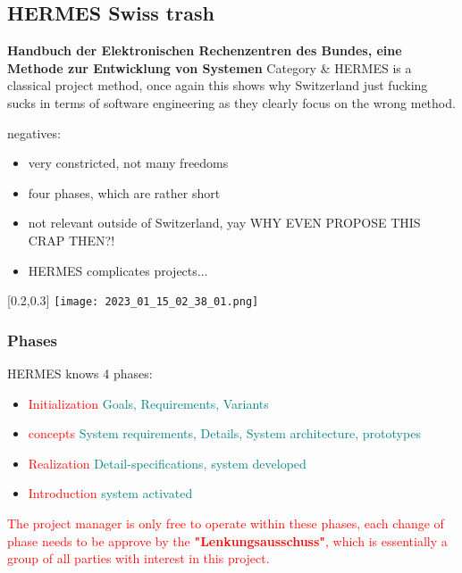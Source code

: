 \documentclass[main.tex,fontsize=12pt,paper=a4,paper=landscape,DIV=calc,]{scrartcl}
\begin{document}
\begin{multicols*}{2}
\subsection{HERMES Swiss trash}
\textbf{Handbuch der Elektronischen Rechenzentren des Bundes, eine Methode zur
Entwicklung von Systemen}\newline
Category \& HERMES is a classical project method, once again this shows why Switzerland just fucking sucks in terms of software engineering as they clearly focus on the wrong method.\newline
{}
{
negatives:\newline
\begin{itemize}
\item very constricted, not many freedoms
\item four phases, which are rather short
\item not relevant outside of Switzerland, yay WHY EVEN PROPOSE THIS CRAP THEN?!
\item HERMES complicates projects...
\end{itemize}
}[0.2,0.3]\newline 
\texttt{[image: 2023\_01\_15\_02\_38\_01.png]}

\subsubsection{Phases} 
HERMES knows 4 phases:\newline
\begin{itemize}
  \item \textcolor{red}{Initialization} \textcolor{teal}{Goals, Requirements, Variants}
  \item \textcolor{red}{concepts} \textcolor{teal}{System requirements, Details, System architecture, prototypes}
  \item \textcolor{red}{Realization} \textcolor{teal}{Detail-specifications, system developed}
  \item \textcolor{red}{Introduction} \textcolor{teal}{system activated}
\end{itemize}
\textcolor{red}{The project manager is only free to operate within these phases, each change of phase needs to be approve by the \textbf{"Lenkungsausschuss"}, which is essentially a group of all parties with interest in this project.}


\end{multicols*}
\end{document}
